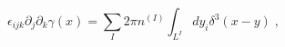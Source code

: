 \begin{equation}
\epsilon _{ijk}\partial _{j}\partial _{k}\gamma (x)=\sum_{I}2\pi
n^{(I)}\int_{L^{I}}dy_{i}\delta ^{3}(x-y)\;,  \label{vc}
\end{equation}

